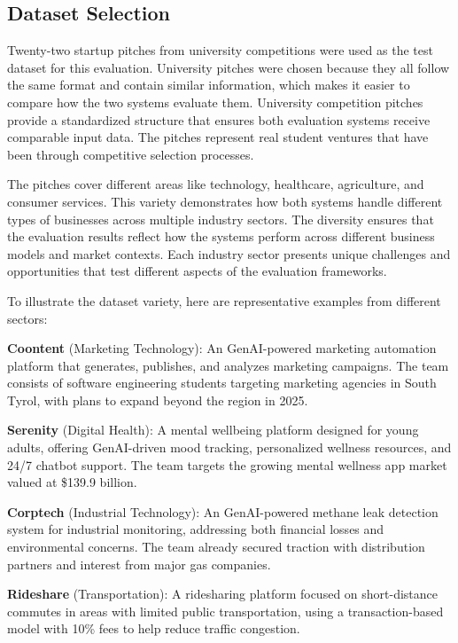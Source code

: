 \subsection{Dataset Selection}
\label{subsec:dataset}

Twenty-two startup pitches from university competitions were used as the test dataset for this evaluation. University pitches were chosen because they all follow the same format and contain similar information, which makes it easier to compare how the two systems evaluate them. University competition pitches provide a standardized structure that ensures both evaluation systems receive comparable input data. The pitches represent real student ventures that have been through competitive selection processes.

The pitches cover different areas like technology, healthcare, agriculture, and consumer services. This variety demonstrates how both systems handle different types of businesses across multiple industry sectors. The diversity ensures that the evaluation results reflect how the systems perform across different business models and market contexts. Each industry sector presents unique challenges and opportunities that test different aspects of the evaluation frameworks.

To illustrate the dataset variety, here are representative examples from different sectors:

\textbf{Coontent} (Marketing Technology): An GenAI-powered marketing automation platform that generates, publishes, and analyzes marketing campaigns. The team consists of software engineering students targeting marketing agencies in South Tyrol, with plans to expand beyond the region in 2025.

\textbf{Serenity} (Digital Health): A mental wellbeing platform designed for young adults, offering GenAI-driven mood tracking, personalized wellness resources, and 24/7 chatbot support. The team targets the growing mental wellness app market valued at \$139.9 billion.

\textbf{Corptech} (Industrial Technology): An GenAI-powered methane leak detection system for industrial monitoring, addressing both financial losses and environmental concerns. The team already secured traction with distribution partners and interest from major gas companies.

\textbf{Rideshare} (Transportation): A ridesharing platform focused on short-distance commutes in areas with limited public transportation, using a transaction-based model with 10\% fees to help reduce traffic congestion.

